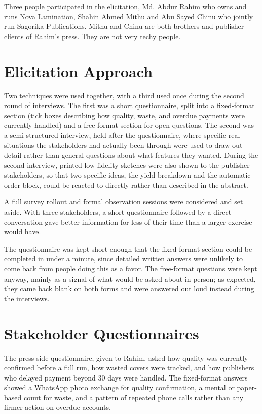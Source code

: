 \documentclass{scrreprt}
\begin{document}
Three people participated in the elicitation, Md. Abdur Rahim who owns and runs Nova Lamination, Shahin Ahmed Mithu and Abu Sayed Chinu who jointly run Sagorika Publications. Mithu and Chinu are both brothers and publisher clients of Rahim's press. They are not very techy people.

\section{Elicitation Approach}
Two techniques were used together, with a third used once during the second round of interviews. The first was a short questionnaire, split into a fixed-format section (tick boxes describing how quality, waste, and overdue payments were currently handled) and a free-format section for open questions. The second was a semi-structured interview, held after the questionnaire, where specific real situations the stakeholders had actually been through were used to draw out detail rather than general questions about what features they wanted. During the second interview, printed low-fidelity sketches were also shown to the publisher stakeholders, so that two specific ideas, the yield breakdown and the automatic order block, could be reacted to directly rather than described in the abstract.

A full survey rollout and formal observation sessions were considered and set aside. With three stakeholders, a short questionnaire followed by a direct conversation gave better information for less of their time than a larger exercise would have.

The questionnaire was kept short enough that the fixed-format section could be completed in under a minute, since detailed written answers were unlikely to come back from people doing this as a favor. The free-format questions were kept anyway, mainly as a signal of what would be asked about in person; as expected, they came back blank on both forms and were answered out loud instead during the interviews.

\section{Stakeholder Questionnaires}
The press-side questionnaire, given to Rahim, asked how quality was currently confirmed before a full run, how wasted covers were tracked, and how publishers who delayed payment beyond 30 days were handled. The fixed-format answers showed a WhatsApp photo exchange for quality confirmation, a mental or paper-based count for waste, and a pattern of repeated phone calls rather than any firmer action on overdue accounts.
\end{document}
